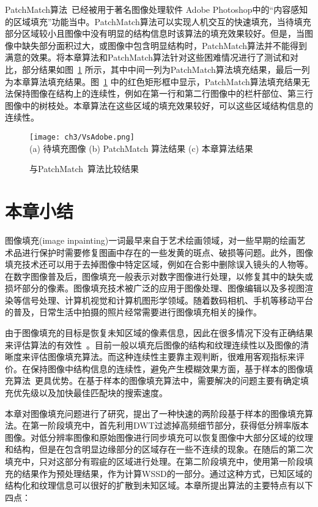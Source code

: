 PatchMatch算法~\cite{Barnes:2009}已经被用于著名图像处理软件 Adobe Photoshop中的``内容感知的区域填充''功能当中。PatchMatch算法可以实现人机交互的快速填充，当待填充部分区域较小且图像中没有明显的结构信息时该算法的填充效果较好。但是，当图像中缺失部分面积过大，或图像中包含明显结构时，PatchMatch算法并不能得到满意的效果。将本章算法和PatchMatch算法针对这些困难情况进行了测试和对比，部分结果如图~\ref{ch3:fig:10} 所示，其中中间一列为PatchMatch算法填充结果，最后一列为本章算法填充结果。图~\ref{ch3:fig:10} 中的红色矩形框中显示，PatchMatch算法填充结果无法保持图像在结构上的连续性，例如在第一行和第二行图像中的栏杆部位、第三行图像中的树枝处。本章算法在这些区域的填充效果较好，可以这些区域结构信息的连续性。
\begin{figure}[!htbp]
\begin{center}
  \texttt{[image: ch3/VsAdobe.png]}
 \\
  (a) 待填充图像 (b) PatchMatch 算法\cite{Barnes:2009}结果    (c) 本章算法结果
\end{center}
\caption{与PatchMatch~\cite{Barnes:2009}算法比较结果}
\label{ch3:fig:10}       %
\end{figure}\par

 \section{本章小结}
 \label{cha3:conclusions}
图像填充(image inpainting)一词最早来自于艺术绘画领域，对一些早期的绘画艺术品进行保护时需要修复图画中存在的一些发黄的斑点、破损等问题。此外，图像填充技术还可以用于去掉图像中特定区域，例如在合影中删除误入镜头的人物等。在数字图像普及后，图像填充一般表示对数字图像进行处理，以修复其中的缺失或损坏部分的像素。图像填充技术被广泛的应用于图像处理、图像编辑以及多视图渲染等信号处理、计算机视觉和计算机图形学领域。随着数码相机、手机等移动平台的普及，日常生活中拍摄的照片经常需要进行图像填充相关的操作。\par
由于图像填充的目标是恢复未知区域的像素信息，因此在很多情况下没有正确结果来评估算法的有效性~\cite{inpaintingSurvey}。目前一般以填充后图像的结构和纹理连续性以及图像的清晰度来评估图像填充算法。而这种连续性主要靠主观判断，很难用客观指标来评价。在保持图像中结构信息的连续性，避免产生模糊效果方面，基于样本的图像填充算法~\cite{Criminisi04regionfilling,Xu:2010}更具优势。在基于样本的图像填充算法中，需要解决的问题主要有确定填充优先级以及加快最佳匹配块的搜索速度。\par
本章对图像填充问题进行了研究，提出了一种快速的两阶段基于样本的图像填充算法。在第一阶段填充中，首先利用DWT过滤掉高频细节部分，获得低分辨率版本图像。对低分辨率图像和原始图像进行同步填充可以恢复图像中大部分区域的纹理和结构，但是在包含明显边缘部分的区域存在一些不连续的现象。在随后的第二次填充中，只对这部分有瑕疵的区域进行处理。在第二阶段填充中，使用第一阶段填充的结果作为预处理结果，作为计算WSSD的一部分。通过这种方式，已知区域的结构化和纹理信息可以很好的扩散到未知区域。本章所提出算法的主要特点有以下四点：

